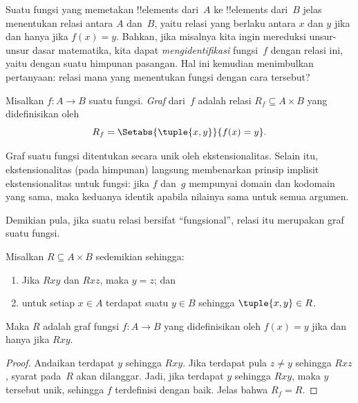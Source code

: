 \documentclass[../../../include/open-logic-section]{subfiles}
\begin{document}


\begin{explain}
Suatu fungsi yang memetakan !!{element}s dari~$A$ ke !!{element}s dari~$B$
jelas menentukan relasi antara $A$ dan~$B$, yaitu relasi yang berlaku antara
$x$ dan $y$ jika dan hanya jika $f(x) = y$. Bahkan, jika misalnya kita ingin
mereduksi unsur-unsur dasar matematika, kita dapat \emph{mengidentifikasi}
fungsi~$f$ dengan relasi ini, yaitu dengan suatu himpunan pasangan. Hal ini
kemudian menimbulkan pertanyaan: relasi mana yang menentukan fungsi dengan
cara tersebut?
\end{explain}

\begin{defn} Misalkan $f\colon A \to B$ suatu fungsi.
\emph{Graf} dari~$f$ adalah relasi $R_f \subseteq A \times B$ yang
didefinisikan oleh
\[
R_f = \Setabs{\tuple{x,y}}{f(x) = y}.
\]
\end{defn}

\begin{explain}
Graf suatu fungsi ditentukan secara unik oleh ekstensionalitas. Selain itu,
ekstensionalitas (pada himpunan) langsung membenarkan prinsip implisit
ekstensionalitas untuk fungsi: jika $f$ dan~$g$ mempunyai domain dan kodomain
yang sama, maka keduanya identik apabila nilainya sama untuk semua argumen.

Demikian pula, jika suatu relasi bersifat ``fungsional'', relasi itu merupakan
graf suatu fungsi.
\end{explain}

\begin{prop}
Misalkan $R \subseteq A \times B$ sedemikian sehingga:
\begin{enumerate}
\item Jika $Rxy$ dan $Rxz$, maka $y = z$; dan
\item untuk setiap $x \in A$ terdapat suatu $y \in B$ sehingga $\tuple{x,
y} \in R$.
\end{enumerate}
Maka $R$ adalah graf fungsi $f\colon A \to B$ yang didefinisikan oleh
$f(x) = y$ jika dan hanya jika $Rxy$.
\end{prop}

\begin{proof}
Andaikan terdapat $y$ sehingga $Rxy$. Jika terdapat pula $z \neq y$ sehingga
$Rxz$, syarat pada~$R$ akan dilanggar. Jadi, jika terdapat $y$ sehingga
$Rxy$, maka $y$ tersebut unik, sehingga $f$ terdefinisi dengan baik. Jelas
bahwa $R_f = R$.
\end{proof}
\end{document}

